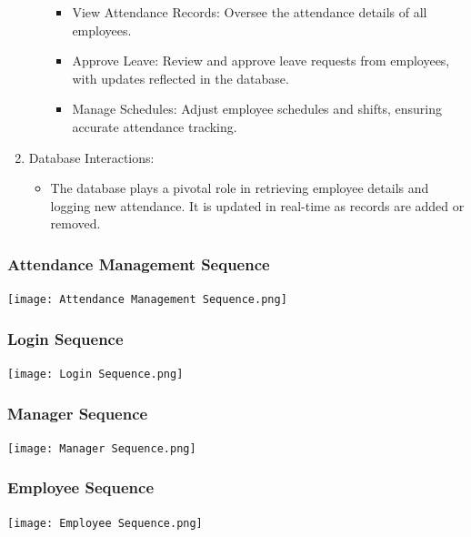 \documentclass[a4paper, 12pt]{article}
\begin{document}
\begin{enumerate}
\begin{itemize}
        \begin{itemize}
            \item View Attendance Records: Oversee the attendance details of all employees.
            \item Approve Leave: Review and approve leave requests from employees, with updates reflected in the database.
            \item Manage Schedules: Adjust employee schedules and shifts, ensuring accurate attendance tracking.
        \end{itemize}
    \end{itemize}
    \item Database Interactions:
    \begin{itemize}
        \item The database plays a pivotal role in retrieving employee details and logging new attendance. It is updated in real-time as records are added or removed.
    \end{itemize}
\end{enumerate}
\subsubsection{Attendance Management Sequence}
\begin{center}
\texttt{[image: Attendance Management Sequence.png]}\par
\end{center}
\subsubsection{Login Sequence}
\begin{center}
\texttt{[image: Login Sequence.png]}\par
\end{center}
\subsubsection{Manager Sequence}
\begin{center}
\texttt{[image: Manager Sequence.png]}\par
\end{center}
\subsubsection{Employee Sequence}
\begin{center}
\texttt{[image: Employee Sequence.png]}\par
\end{center}
\end{document}
